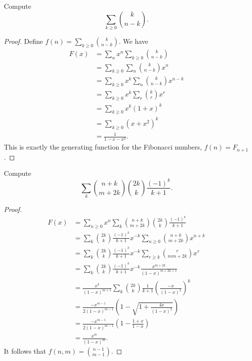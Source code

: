 \documentclass[11pt]{article}
\renewcommand{\>}{\rangle}
\newcommand{\<}{\langle}
\begin{document}
\begin{example} Compute $$\sum_{k \ge 0} \binom{k}{n-k}.$$

\end{example}
\begin{proof}
Define $f(n) = \sum_{k \ge 0} \binom{k}{n-k}$.  We have 
\begin{align*}
F(x) &= \sum_n x^n \sum_{k \ge 0} \binom{k}{n-k} \\
&= \sum_{k \ge 0} \sum_{n} \binom{k}{n-k} x^n \\
&= \sum_{k \ge 0} x^{k} \sum_{n} \binom{k}{n-k} x^{n-k} \\
&= \sum_{k \ge 0} x^k \sum_{r} \binom{k}{r} x^r \\
&= \sum_{k \ge 0} x^k (1 + x)^k \\
&= \sum_{k \ge 0} (x + x^2)^k \\
&= \frac{1}{1 - x -x^2}.
\end{align*}
This is exactly the generating function for the Fibonacci numbers, $f(n) = F_{n + 1}$.
\end{proof}
\begin{example} Compute 
$$\sum_k \binom{n + k}{m + 2k} \binom{2k}{k} \frac{(-1)^k}{k + 1}.$$
\end{example}
\begin{proof}
\begin{align*}
F(x) &= \sum_{n \ge 0} x^n \sum_{k} \binom{n + k}{m + 2k} \binom{2k}{k} \frac{(-1)^k}{k + 1} \\
&= \sum_k \binom{2k}{k} \frac{(-1)^k}{k + 1} x^{-k} \sum_{n \ge 0} \binom{n + k}{m + 2k} x^{n + k} \\
&= \sum_k \binom{2k}{k} \frac{(-1)^k}{k+1} x^{-k} \sum_{r\ge k} \binom{r}{mm + 2k} x^r \\
&= \sum_k \binom{2k}{k} \frac{(-1)^k}{k+1} x^{-k} \frac{x^{m + 2k}}{(1 - x)^{m + 2k + 1}} \\
&= \frac{x^k}{(1 - x)^{m + 1} }\sum_k \binom{2k}{k} \frac{1}{k + 1} \left(\frac{-x}{(1-x)^2} \right)^k \\
&= \frac{-x^{m-1}}{2(1-x)^{m-1}} \left (1 - \sqrt{1 + \frac{4x}{(1-x)^2}} \right) \\
&= \frac{-x^{m-1}}{2(1-x)^{m-1}} \left (1 - \frac{1+x}{1-x} \right) \\
&= \frac{x^m}{(1-x)^m}.
\end{align*}
It follows that $f(n, m) = \binom{n-1}{m-1}$.
\end{proof}

 
\end{document}

